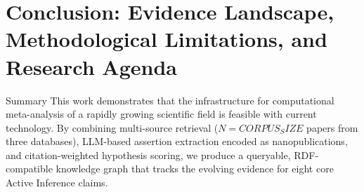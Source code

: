 \documentclass[
  ignorenonframetext,
]{beamer}
\author{\texorpdfstring{}{}}
\date{}
\begin{document}
\section{\texorpdfstring{Conclusion: Evidence Landscape, Methodological
Limitations, and Research Agenda
\label{sec:conclusion}}{Conclusion: Evidence Landscape, Methodological Limitations, and Research Agenda }}\label{conclusion-evidence-landscape-methodological-limitations-and-research-agenda}

\begin{frame}{Summary}
\protect{}\label{summary}
This work demonstrates that the infrastructure for computational
meta-analysis of a rapidly growing scientific field is feasible with
current technology. By combining multi-source retrieval
(\(N = {{CORPUS_SIZE}}\) papers from three databases), LLM-based
assertion extraction encoded as nanopublications, and citation-weighted
hypothesis scoring, we produce a queryable, RDF-compatible knowledge
graph that tracks the evolving evidence for eight core Active Inference
claims.
\end{frame}
\end{document}
